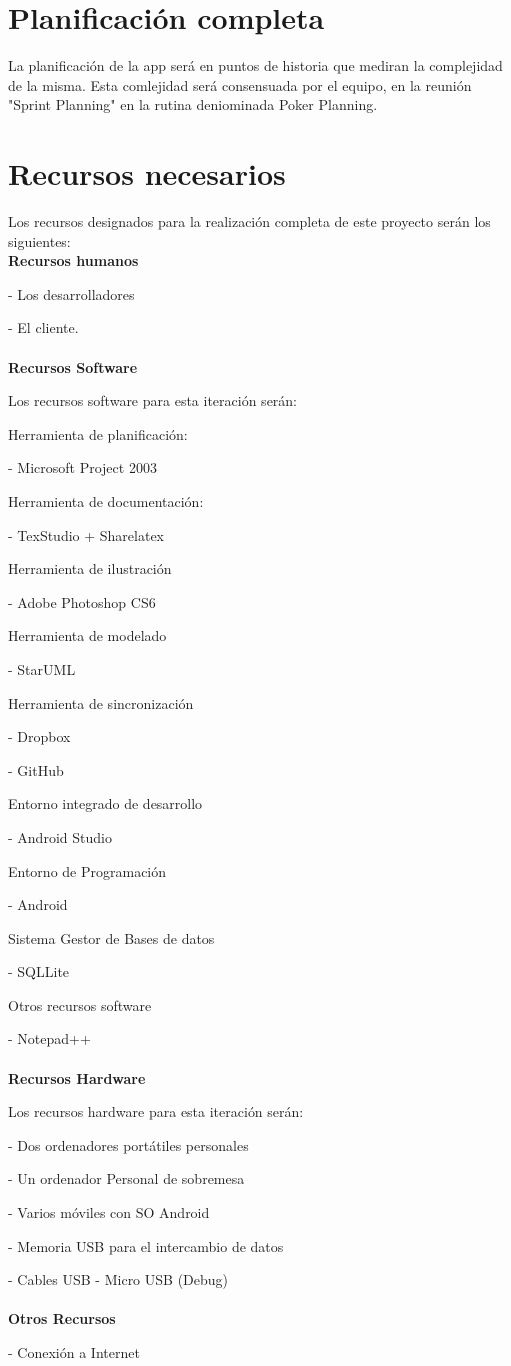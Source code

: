 \documentclass[../pfc.tex]{subfiles}
\begin{document}
	\section{Planificación completa}
	
	La planificación de la app será en puntos de historia que mediran la complejidad de la misma. Esta comlejidad será consensuada por el equipo, en la reunión "Sprint Planning" en la rutina deniominada Poker Planning.  
	
	\section{Recursos necesarios}
	Los recursos designados para la realización completa de este proyecto serán los siguientes:\\
	
	\textbf{Recursos humanos}
	
	- Los desarrolladores
	
	- El cliente.\\\\
	
	\textbf{Recursos Software}
	
	Los recursos software para esta iteración serán:
	
	Herramienta de planificación:
	
	- Microsoft Project 2003
	
	Herramienta de documentación:
	
	- TexStudio + Sharelatex
	
	Herramienta de ilustración
	
	- Adobe Photoshop CS6
	
	Herramienta de modelado
	
	- StarUML
	
	Herramienta de sincronización
	
	- Dropbox
	
	- GitHub
	
	Entorno integrado de desarrollo
	
	- Android Studio
	
	Entorno de Programación
	
	- Android
	
	Sistema Gestor de Bases de datos
	
	- SQLLite
	
	Otros recursos software
	
	- Notepad++\\\\
	
	\textbf{Recursos Hardware}
	
	Los recursos hardware para esta iteración serán:
	
	- Dos ordenadores portátiles personales
	
	- Un ordenador Personal de sobremesa
	
	- Varios móviles con SO Android
	
	- Memoria USB para el intercambio de datos
	
	- Cables USB - Micro USB (Debug)\\\\
	
	\textbf{Otros Recursos}
	
	- Conexión a Internet \newpage
	
\end{document}
